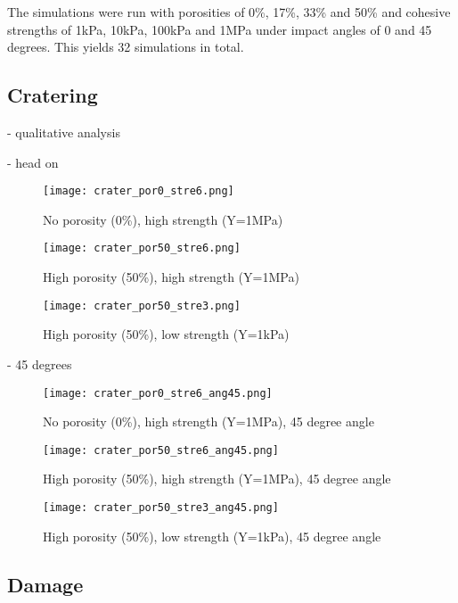 The simulations were run with porosities of 0\%, 17\%, 33\% and 50\% and cohesive strengths of 1kPa, 10kPa, 100kPa and 1MPa under impact angles of 0 and 45 degrees. This yields 32 simulations in total.

\subsection{Cratering}
- qualitative analysis

- head on
\begin{figure}[H]
   \centering
   \texttt{[image: crater\_por0\_stre6.png]}
   \caption{No porosity (0\%), high strength (Y=1MPa)}
   \label{fig:crater1}
\end{figure}


\begin{figure}[H]
   \centering
   \texttt{[image: crater\_por50\_stre6.png]}
   \caption{High porosity (50\%), high strength (Y=1MPa)}
   \label{fig:crater2}
\end{figure}

\begin{figure}[H]
   \centering
   \texttt{[image: crater\_por50\_stre3.png]}
   \caption{High porosity (50\%), low strength (Y=1kPa)}
   \label{fig:crater3}
\end{figure}

- 45 degrees
\begin{figure}[H]
   \centering
   \texttt{[image: crater\_por0\_stre6\_ang45.png]}
   \caption{No porosity (0\%), high strength (Y=1MPa), 45 degree angle}
   \label{fig:crater4}
\end{figure}


\begin{figure}[H]
   \centering
   \texttt{[image: crater\_por50\_stre6\_ang45.png]}
   \caption{High porosity (50\%), high strength (Y=1MPa), 45 degree angle}
   \label{fig:crater5}
\end{figure}

\begin{figure}[H]
   \centering
   \texttt{[image: crater\_por50\_stre3\_ang45.png]}
   \caption{High porosity (50\%), low strength (Y=1kPa), 45 degree angle}
   \label{fig:crater6}
\end{figure}

\subsection{Damage}

